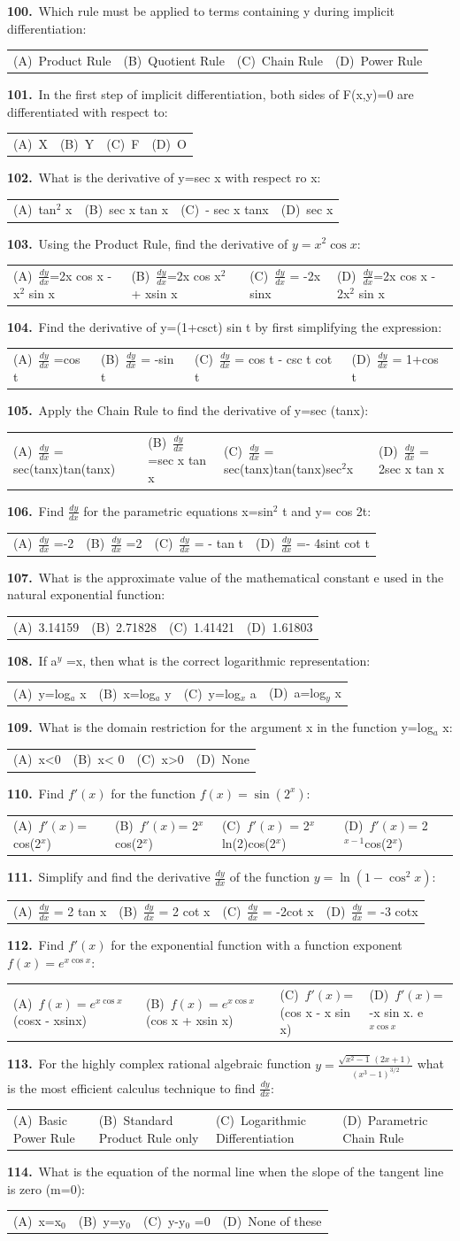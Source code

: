 \documentclass[11pt,a4paper]{article}
\makeatletter
\newcommand{\mcq}[6]{%
  \Needspace{4\baselineskip}%
  \par\medskip\noindent\textbf{#1.}\ #2\par\nopagebreak
  \noindent\begin{tabularx}{\linewidth}{@{\hspace{1.5em}}*{4}{>{\raggedright\arraybackslash}X}@{}}
    (A)~#3 & (B)~#4 & (C)~#5 & (D)~#6
  \end{tabularx}\par}
\makeatother
\begin{document}
\mcq{100}{Which rule must be applied to terms containing y during implicit differentiation:}{Product Rule}{Quotient Rule}{Chain Rule}{Power Rule}
\mcq{101}{In the first step of implicit differentiation, both sides of F(x,y)=0 are differentiated with respect to:}{X}{Y}{F}{O}
\mcq{102}{What is the derivative of y=sec x with respect ro x:}{tan$^{2}$ x}{sec x tan x}{- sec x tanx}{sec x}
\mcq{103}{Using the Product Rule, find the derivative of $y=x^{2}\cos x$:}{$\frac{dy}{dx}$=2x cos x - x$^{2}$ sin x}{$\frac{dy}{dx}$=2x cos x$^{2}$ + xsin x}{$\frac{dy}{dx}$ = -2x sinx}{$\frac{dy}{dx}$=2x cos x - 2x$^{2}$ sin x}
\mcq{104}{Find the derivative of y=(1+csct) sin t by first simplifying the expression:}{$\frac{dy}{dx}$ =cos t}{$\frac{dy}{dx}$ = -sin t}{$\frac{dy}{dx}$ = cos t - csc t cot t}{$\frac{dy}{dx}$ = 1+cos t}
\mcq{105}{Apply the Chain Rule to find the derivative of y=sec (tanx):}{$\frac{dy}{dx}$ = sec(tanx)tan(tanx)}{$\frac{dy}{dx}$ =sec x tan x}{$\frac{dy}{dx}$ = sec(tanx)tan(tanx)sec$^{2}$x}{$\frac{dy}{dx}$ = 2sec x tan x}
\mcq{106}{Find $\frac{dy}{dx}$ for the parametric equations x=sin$^{2}$ t and y= cos 2t:}{$\frac{dy}{dx}$ =-2}{$\frac{dy}{dx}$ =2}{$\frac{dy}{dx}$ = - tan t}{$\frac{dy}{dx}$ =- 4sint cot t}
\mcq{107}{What is the approximate value of the mathematical constant e used in the natural exponential function:}{3.14159}{2.71828}{1.41421}{1.61803}
\mcq{108}{If a$^{y}$ =x, then what is the correct logarithmic representation:}{y=log$_{a}$ x}{x=log$_{a}$ y}{y=log$_{x}$ a}{a=log$_{y}$ x}
\mcq{109}{What is the domain restriction for the argument x in the function y=log$_{a}$ x:}{x{<}0}{x{<} 0}{x{>}0}{None}
\mcq{110}{Find $f'(x)$ for the function $f(x)=\sin(2^{x})$:}{$f'(x)$= cos(2$^{x}$)}{$f'(x)$= 2$^{x}$cos(2$^{x}$)}{$f'(x)$ = 2$^{x}$ln(2)cos(2$^{x}$)}{$f'(x)$= 2$^{x-1}$cos(2$^{x}$)}
\mcq{111}{Simplify and find the derivative $\frac{dy}{dx}$ of the function $y=\ln(1-\cos^{2}x)$:}{$\frac{dy}{dx}$ = 2 tan x}{$\frac{dy}{dx}$ = 2 cot x}{$\frac{dy}{dx}$ = -2cot x}{$\frac{dy}{dx}$ = -3 cotx}
\mcq{112}{Find $f'(x)$ for the exponential function with a function exponent $f(x)=e^{x\cos x}$:}{$f(x)=e^{x\cos x}$ (cosx - xsinx)}{$f(x)=e^{x\cos x}$ (cos x + xsin x)}{$f'(x)$=(cos x - x sin x)}{$f'(x)$= -x sin x. e$^{x\cos x}$}
\mcq{113}{For the highly complex rational algebraic function $y=\frac{\sqrt{x^{2}-1}\,(2x+1)}{(x^{3}-1)^{3/2}}$ what is the most efficient calculus technique to find $\frac{dy}{dx}$:}{Basic Power Rule}{Standard Product Rule only}{Logarithmic Differentiation}{Parametric Chain Rule}
\mcq{114}{What is the equation of the normal line when the slope of the tangent line is zero (m=0):}{x=x$_{0}$}{y=y$_{0}$}{y-y$_{0}$ =0}{None of these}
\end{document}
